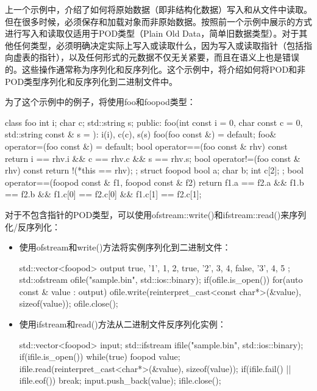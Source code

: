 上一个示例中，介绍了如何将原始数据（即非结构化数据）写入和从文件中读取。但在很多时候，必须保存和加载对象而非原始数据。按照前一个示例中展示的方式进行写入和读取仅适用于POD类型（Plain Old Data，简单旧数据类型）。对于其他任何类型，必须明确决定实际上写入或读取什么，因为写入或读取指针（包括指向虚表的指针），以及任何形式的元数据不仅无关紧要，而且在语义上也是错误的。这些操作通常称为序列化和反序列化。这个示例中，将介绍如何将POD和非POD类型序列化和反序列化到二进制文件中。


为了这个示例中的例子，将使用foo和foopod类型：

\begin{cpp}
class foo
{
    int         i;
    char        c;
    std::string s;
public:
    foo(int const i = 0, char const c = 0, std::string const & s = {}):
        i(i), c(c), s(s)
    {}
    foo(foo const &) = default;
    foo& operator=(foo const &) = default;
    bool operator==(foo const & rhv) const
    {
        return i == rhv.i &&
               c == rhv.c &&
               s == rhv.s;
    }
    bool operator!=(foo const & rhv) const
    {
        return !(*this == rhv);
    }
};
struct foopod
{
    bool a;
    char b;
    int  c[2];
};
bool operator==(foopod const & f1, foopod const & f2)
{
    return f1.a == f2.a && f1.b == f2.b &&
           f1.c[0] == f2.c[0] && f1.c[1] == f2.c[1];
}
\end{cpp}



对于不包含指针的POD类型，可以使用ofstream::write()和ifstream::read()来序列化/反序列化：

\begin{itemize}
\item
使用ofstream和write()方法将实例序列化到二进制文件：

\begin{cpp}
std::vector<foopod> output {
    {true, '1', {1, 2}},
    {true, '2', {3, 4}},
    {false, '3', {4, 5}}
};
std::ofstream ofile("sample.bin", std::ios::binary);
if(ofile.is_open())
{
    for(auto const & value : output)
    {
        ofile.write(reinterpret_cast<const char*>(&value),
        sizeof(value));
    }
    ofile.close();
}
\end{cpp}

\item
使用ifstream和read()方法从二进制文件反序列化实例：

\begin{cpp}
std::vector<foopod> input;
std::ifstream ifile("sample.bin", std::ios::binary);
if(ifile.is_open())
{
    while(true)
    {
        foopod value;
        ifile.read(reinterpret_cast<char*>(&value), sizeof(value));
        if(ifile.fail() || ifile.eof()) break;
        input.push_back(value);
    }
    ifile.close();
}
\end{cpp}

\end{itemize}

